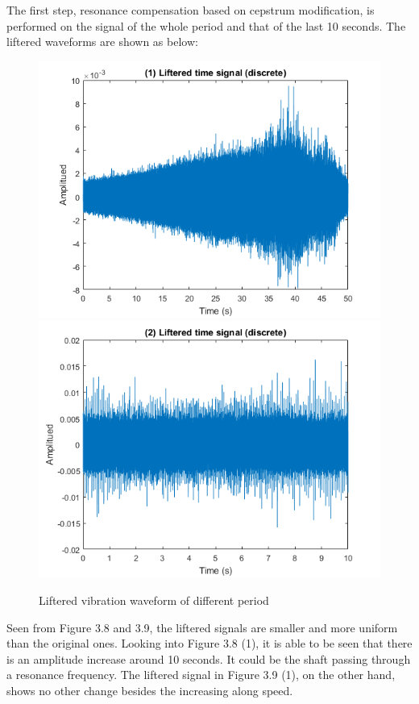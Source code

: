 The first step, resonance compensation based on cepstrum modification, is performed on the signal of the whole period and that of the last 10 seconds. The liftered waveforms are shown as below:

\begin{figure}[h]
	\centering
	\includegraphics[scale =0.48]{wavelift}
	\includegraphics[scale =0.48]{last10lift}
	\caption{Liftered vibration waveform of different period}
	\label{wave2}
\end{figure}

Seen from Figure 3.8 and 3.9, the liftered signals are smaller and more uniform than the original ones. Looking into Figure 3.8 (1), it is able to be seen that there is an amplitude increase around 10 seconds. It could be the shaft passing through a resonance frequency. The liftered signal in Figure 3.9 (1), on the other hand, shows no other change besides the increasing along speed.

